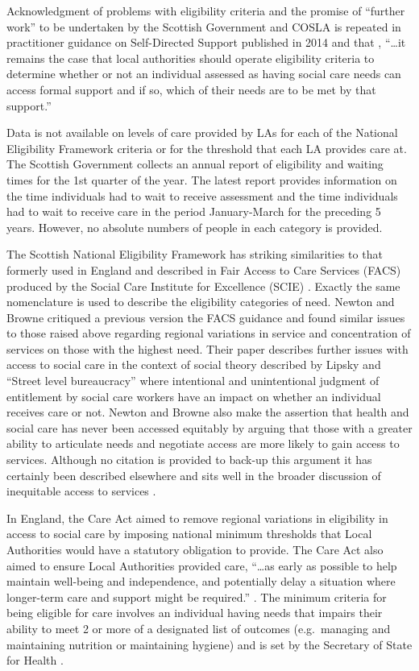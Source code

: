 \documentclass[12pt,]{report}
\begin{document}
Acknowledgment of problems with eligibility criteria and the promise of
``further work'' to be undertaken by the Scottish Government and COSLA
is repeated in practitioner guidance on Self-Directed Support published
in 2014 \citep[pp.19]{RN170} and that , ``\ldots{}it remains the case
that local authorities should operate eligibility criteria to determine
whether or not an individual assessed as having social care needs can
access formal support and if so, which of their needs are to be met by
that support.''

Data is not available on levels of care provided by LAs for each of the
National Eligibility Framework criteria or for the threshold that each
LA provides care at. The Scottish Government collects an annual report
of eligibility and waiting times for the 1st quarter of the year. The
latest report \citep{RN184} provides information on the time individuals
had to wait to receive assessment and the time individuals had to wait
to receive care in the period January-March for the preceding 5 years.
However, no absolute numbers of people in each category is provided.

The Scottish National Eligibility Framework has striking similarities to
that formerly used in England and described in Fair Access to Care
Services (FACS) produced by the Social Care Institute for Excellence
(SCIE) \citeyearpar{RN138}. Exactly the same nomenclature is used to
describe the eligibility categories of need. Newton and Browne
\citeyearpar{RN163} critiqued a previous version the FACS guidance and
found similar issues to those raised above regarding regional variations
in service and concentration of services on those with the highest need.
Their paper describes further issues with access to social care in the
context of social theory described by Lipsky \citeyearpar{RN174} and
``Street level bureaucracy'' where intentional and unintentional
judgment of entitlement by social care workers have an impact on whether
an individual receives care or not. Newton and Browne
\citeyearpar{RN163} also make the assertion that health and social care
has never been accessed equitably by arguing that those with a greater
ability to articulate needs and negotiate access are more likely to gain
access to services. Although no citation is provided to back-up this
argument it has certainly been described elsewhere \citep{RN118} and
sits well in the broader discussion of inequitable access to services
\citep{RN116, RN175, RN120}.

In England, the Care Act \citeyearpar{RN176} aimed to remove regional
variations in eligibility in access to social care by imposing national
minimum thresholds that Local Authorities would have a statutory
obligation to provide. The Care Act also aimed to ensure Local
Authorities provided care, ``\ldots{}as early as possible to help
maintain well-being and independence, and potentially delay a situation
where longer-term care and support might be required.''
\citep[pp.2]{RN169}. The minimum criteria for being eligible for care
involves an individual having needs that impairs their ability to meet 2
or more of a designated list of outcomes (e.g.~managing and maintaining
nutrition or maintaining hygiene) \citep{RN169} and is set by the
Secretary of State for Health \citep{RN177}.
\end{document}
